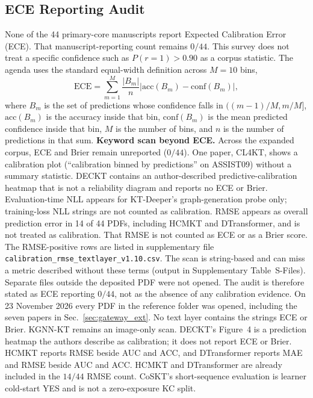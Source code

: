 \documentclass[lettersize,journal]{IEEEtran}
\begin{document}
\subsection{ECE Reporting Audit}
None of the 44 primary-core manuscripts report Expected Calibration Error (ECE). That manuscript-reporting count remains $0/44$. This survey does not treat a specific confidence such as $P(r=1)>0.90$ as a corpus statistic. The agenda uses the standard equal-width definition across $M=10$ bins,
\begin{equation}
\text{ECE} = \sum_{m=1}^{M} \frac{|B_m|}{n} \left| \text{acc}(B_m) - \text{conf}(B_m) \right|,
\end{equation}
where $B_m$ is the set of predictions whose confidence falls in $((m-1)/M, m/M]$, $\mathrm{acc}(B_m)$ is the accuracy inside that bin, $\mathrm{conf}(B_m)$ is the mean predicted confidence inside that bin, $M$ is the number of bins, and $n$ is the number of predictions in that sum.
\textbf{Keyword scan beyond ECE.} Across the expanded corpus, ECE and Brier remain unreported ($0/44$). One paper, CL4KT, shows a calibration plot (``calibration binned by predictions'' on ASSIST09) without a summary statistic. DECKT contains an author-described predictive-calibration heatmap that is not a reliability diagram and reports no ECE or Brier. Evaluation-time NLL appears for KT-Deeper's graph-generation probe only; training-loss NLL strings are not counted as calibration. RMSE appears as overall prediction error in 14 of 44 PDFs, including HCMKT and DTransformer, and is not treated as calibration. That RMSE is not counted as ECE or as a Brier score. The RMSE-positive rows are listed in supplementary file \texttt{calibration\_rmse\_textlayer\_v1.10.csv}. The scan is string-based and can miss a metric described without these terms (output in Supplementary Table~S-Files). Separate files outside the deposited PDF were not opened. The audit is therefore stated as ECE reporting $0/44$, not as the absence of any calibration evidence. On 23 November 2026 every PDF in the reference folder was opened, including the seven papers in Sec.~\ref{sec:gateway_ext}. No text layer contains the strings ECE or Brier. KGNN-KT remains an image-only scan. DECKT's Figure~4 is a prediction heatmap the authors describe as calibration; it does not report ECE or Brier. HCMKT reports RMSE beside AUC and ACC, and DTransformer reports MAE and RMSE beside AUC and ACC. HCMKT and DTransformer are already included in the $14/44$ RMSE count. CoSKT's short-sequence evaluation is learner cold-start YES and is not a zero-exposure KC split.
\end{document}
